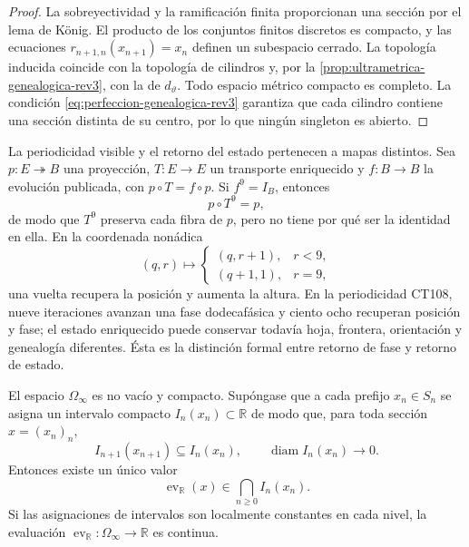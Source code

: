 \begin{proof}
La sobreyectividad y la ramificación finita proporcionan una sección por el
lema de König. El producto de los conjuntos finitos discretos es compacto, y
las ecuaciones \(r_{n+1,n}(x_{n+1})=x_n\) definen un subespacio cerrado. La
topología inducida coincide con la topología de cilindros y, por la
\cref{prop:ultrametrica-genealogica-rev3}, con la de
\(d_\vartheta\). Todo espacio métrico compacto es completo. La condición
\eqref{eq:perfeccion-genealogica-rev3} garantiza que cada cilindro contiene
una sección distinta de su centro, por lo que ningún singleton es abierto.
\end{proof}

La periodicidad visible y el retorno del estado pertenecen a mapas
distintos. Sea \(p:E\twoheadrightarrow B\) una proyección, \(T:E\to E\) un
transporte enriquecido y \(f:B\to B\) la evolución publicada, con
\(p\circ T=f\circ p\). Si \(f^9=I_B\), entonces
\begin{equation}
 p\circ T^9=p,
 \label{eq:retorno-visible-fibra-rev3}
\end{equation}
de modo que \(T^9\) preserva cada fibra de \(p\), pero no tiene por qué ser
la identidad en ella. En la coordenada nonádica
\[
 (q,r)\longmapsto
 \begin{cases}
  (q,r+1),&r<9,\\
  (q+1,1),&r=9,
 \end{cases}
\]
una vuelta recupera la posición y aumenta la altura. En la periodicidad
CT108, nueve iteraciones avanzan una fase dodecafásica y ciento ocho
recuperan posición y fase; el estado enriquecido puede conservar todavía
hoja, frontera, orientación y genealogía diferentes. Ésta es la distinción
formal entre retorno de fase y retorno de estado.

\begin{theorem}
\label{thm:reconstruccion-continuo-secciones-rev2}
El espacio \(\Omega_\infty\) es no vacío y compacto. Supóngase que a cada
prefijo \(x_n\in S_n\) se asigna un intervalo compacto
\(I_n(x_n)\subset\mathbb R\) de modo que, para toda sección
\(x=(x_n)_n\),
\[
 I_{n+1}(x_{n+1})\subseteq I_n(x_n),
 \qquad
 \operatorname{diam}I_n(x_n)\longrightarrow0.
\]
Entonces existe un único valor
\begin{equation}
 \operatorname{ev}_{\mathbb R}(x)
 \in\bigcap_{n\geq0}I_n(x_n).
 \label{eq:evaluacion-seccion-continua-rev2}
\end{equation}
Si las asignaciones de intervalos son localmente constantes en cada nivel, la
evaluación \(\operatorname{ev}_{\mathbb R}:\Omega_\infty\to\mathbb R\) es
continua.
\end{theorem}

